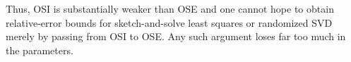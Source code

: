 \documentclass[onefignum,onetabnum]{siamart251216}
\newcommand{\R}{\mathbb{R}}
\newcommand{\norm}[1]{\left\lVert #1 \right\rVert}
\begin{document}
Thus, OSI is substantially weaker than OSE and one cannot hope to obtain relative-error bounds for sketch-and-solve least squares or randomized SVD merely by passing from OSI to OSE.  Any such argument loses far too much in the parameters.

\end{document}
